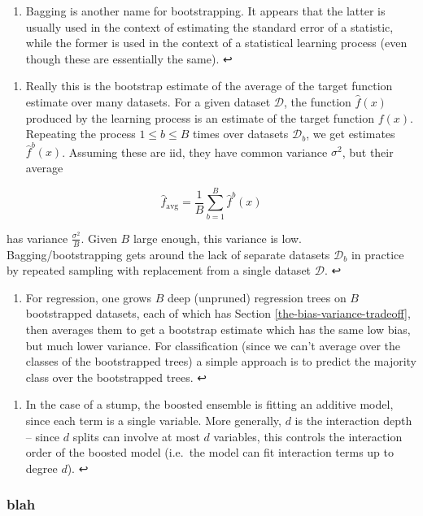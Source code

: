 \documentclass[11pt]{article}
\providecommand{\tightlist}{%
      \setlength{\itemsep}{0pt}\setlength{\parskip}{0pt}}
\begin{document}
\hypertarget{foot74}{}
\begin{enumerate}
\def\labelenumi{\arabic{enumi}.}
\setcounter{enumi}{73}
\tightlist
\item
  Bagging is another name for bootstrapping. It appears that the latter
  is usually used in the context of estimating the standard error of a
  statistic, while the former is used in the context of a statistical
  learning process (even though these are essentially the same). ↩
\end{enumerate}

\hypertarget{foot75}{}
\begin{enumerate}
\def\labelenumi{\arabic{enumi}.}
\setcounter{enumi}{74}
\tightlist
\item
  Really this is the bootstrap estimate of the average of the target
  function estimate over many datasets. For a given dataset
  \(\mathcal{D}\), the function \(\hat{f}(x)\) produced by the learning
  process is an estimate of the target function \(f(x)\). Repeating the
  process \(1 \leqslant b \leqslant B\) times over datasets
  \(\mathcal{D}_b\), we get estimates \(\hat{f}^b(x)\). Assuming these
  are iid, they have common variance \(\sigma^2\), but their average
\end{enumerate}

\[\hat{f}_{\text{avg}} = \frac{1}{B} \sum_{b = 1}^B \hat{f}^{b}(x)\]

has variance \(\frac{\sigma^2}{B}\). Given \(B\) large enough, this
variance is low. Bagging/bootstrapping gets around the lack of separate
datasets \(\mathcal{D}_b\) in practice by repeated sampling with
replacement from a single dataset \(\mathcal{D}\). ↩

\hypertarget{foot76}{}
\begin{enumerate}
\def\labelenumi{\arabic{enumi}.}
\setcounter{enumi}{75}
\tightlist
\item
  For regression, one grows \(B\) deep (unpruned) regression trees on
  \(B\) bootstrapped datasets, each of which has
  Section \ref{the-bias-variance-tradeoff}, then averages them to get a
  bootstrap estimate which has the same low bias, but much lower
  variance. For classification (since we can't average over the classes
  of the bootstrapped trees) a simple approach is to predict the
  majority class over the bootstrapped trees. ↩
\end{enumerate}

\hypertarget{foot77}{}
\begin{enumerate}
\def\labelenumi{\arabic{enumi}.}
\setcounter{enumi}{76}
\tightlist
\item
  In the case of a stump, the boosted ensemble is fitting an additive
  model, since each term is a single variable. More generally, \(d\) is
  the interaction depth -- since \(d\) splits can involve at most \(d\)
  variables, this controls the interaction order of the boosted model
  (i.e.~the model can fit interaction terms up to degree \(d\)). ↩
\end{enumerate}

    \hypertarget{blah}{%
\subsubsection{blah}\label{blah}}


    
    
    
    
\end{document}
